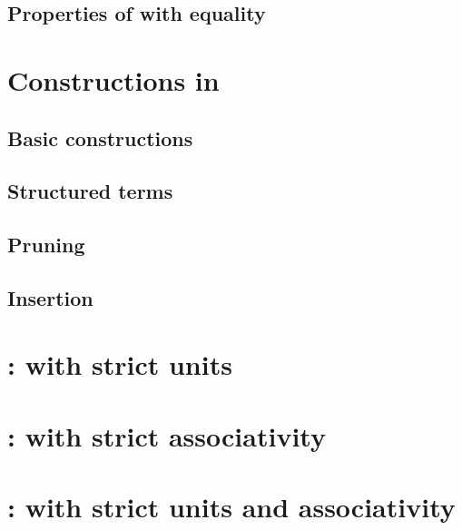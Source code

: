 \documentclass{cam-thesis}
\begin{document}
\section{Properties of \Catt with equality}
\label{sec:properties-catt-with}

\chapter{Constructions in \Catt}
\label{sec:operations-catt}

\section{Basic constructions}
\label{sec:basic-constructions}

\section{Structured terms}
\label{sec:structured-terms}

\section{Pruning}
\label{sec:pruning}

\section{Insertion}
\label{sec:insertion}

\chapter{\Cattsu : \Catt with strict units}
\label{cha:cattsu}

\chapter{\Cattsa : \Catt with strict associativity}
\label{cha:cattsa}

\chapter{\Cattsua : \Catt with strict units and associativity}
\label{cha:cattsua}


















\printbibliography
\end{document}
